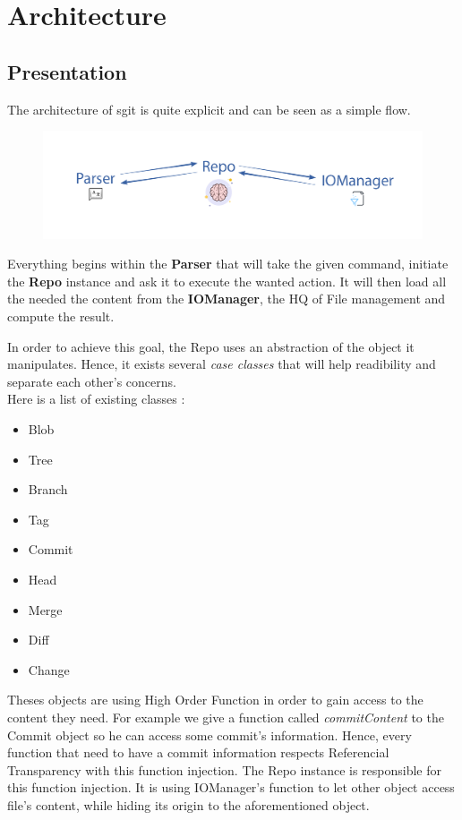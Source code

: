 \documentclass[11pt]{article}
\begin{document}
\section{Architecture}
\subsection{Presentation}
The architecture of sgit is quite explicit and can be seen as a simple flow.

\begin{figure}[h!]
  \centering
  \includegraphics[width=\linewidth]{img/flow.png}
\end{figure}

Everything begins within the \textbf{Parser} that will take the given command, initiate the \textbf{Repo} instance and ask it to execute the wanted action. It will then load all the needed the content from the \textbf{IOManager}, the HQ of File management and compute the result.

In order to achieve this goal, the Repo uses an abstraction of the object it manipulates. Hence, it exists several \textit{case classes} that will help readibility and separate each other's concerns.\\

Here is a list of existing classes :
\begin{multicols}{3}
\begin{itemize}
  \setlength\itemsep{0.1em}
  \item Blob
  \item Tree
  \item Branch
  \item Tag
  \item Commit
  \item Head
  \item Merge
  \item Diff
  \item Change
\end{itemize}
\end{multicols}

Theses objects are using High Order Function in order to gain access to the content they need. For example we give a function called \textit{commitContent} to the Commit object so he can access some commit's information. Hence, every function that need to have a commit information respects Referencial Transparency with this function injection.
The Repo instance is responsible for this function injection. It is using IOManager's function to let other object access file's content, while hiding its origin to the aforementioned object.
\end{document}
